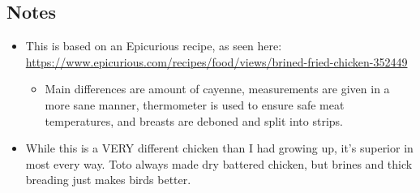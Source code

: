 \begin{multicols}{2}
\subsection*{Notes}
\begin{itemize}
    \item This is based on an Epicurious recipe, as seen here: \url{https://www.epicurious.com/recipes/food/views/brined-fried-chicken-352449}
    \begin{itemize}
        \item Main differences are amount of cayenne, measurements are given in a more sane manner, thermometer is used to ensure safe meat temperatures, and breasts are deboned and split into strips.
    \end{itemize}
    \item While this is a VERY different chicken than I had growing up, it's superior in most every way. Toto always made dry battered chicken, but brines and thick breading just makes birds better.
\end{itemize}
\end{multicols}
\clearpage